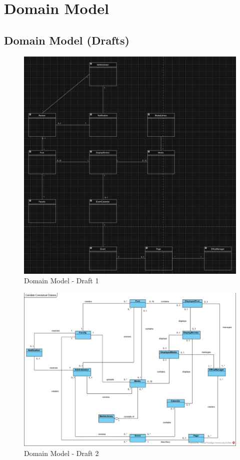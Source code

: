 \documentclass{article}
\begin{document}
\section{Domain Model}
\subsection{Domain Model (Drafts)}
\begin{figure}[H]
    \includegraphics[width=.9\textwidth]{./Initial Domain Model.png}
    \centering
    \caption{Domain Model - Draft 1}
    \label{fig:DraftDomainv1}
\end{figure}

\begin{figure}[H]
    \includegraphics[width=.9\textwidth]{./draft-DomainModel.jpg}
    \centering
    \caption{Domain Model - Draft 2}
    \label{fig:DraftDomainv2}
\end{figure}
\end{document}
